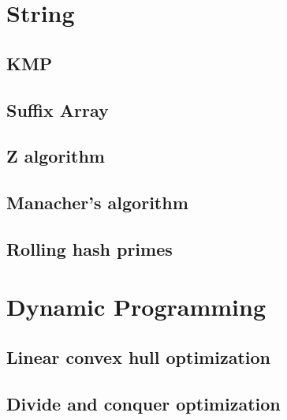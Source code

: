 \documentclass[a4paper,10pt,twocolumn,oneside]{article}
\begin{document}
\section{String}
\subsection{KMP}

\subsection{Suffix Array}

\subsection{Z algorithm}

\subsection{Manacher's algorithm}

\subsection{Rolling hash primes}

\section{Dynamic Programming}
\subsection{Linear convex hull optimization}

\subsection{Divide and conquer optimization}

\end{document}
